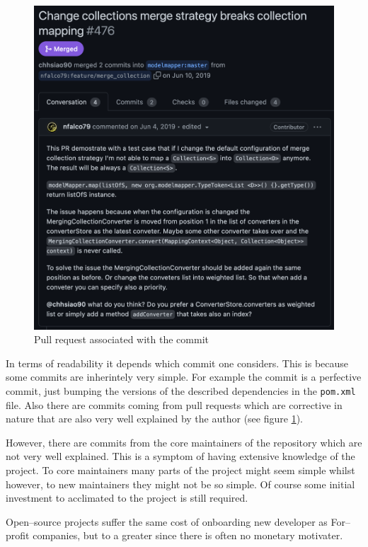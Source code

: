 \documentclass[12pt]{article}
\begin{document}
\begin{figure}[H]
    \centering
    \includegraphics[width=14cm]{images/pull-request.png}
    \caption{Pull request associated with the  commit}
    \label{pull-request}
\end{figure}

In terms of readability it depends which commit one considers.
This is because some commits are inherintely very simple. For
example the  commit is a perfective commit, just bumping
the versions of the described dependencies in the
\texttt{pom.xml} file. Also there are commits coming from pull
requests which are corrective in nature that are also very well
explained by the author (see figure \ref{pull-request}).

However, there are commits from the core maintainers of the
repository which are not very well explained. This is a symptom
of having extensive knowledge of the project. To core
maintainers many parts of the project might seem simple whilst
however, to new maintainers they might not be so simple. Of
course some initial investment to acclimated to the project is
still required.

Open--source projects suffer the same cost of onboarding new
developer as For--profit companies, but to a greater since there
is often no monetary motivater.
\end{document}
